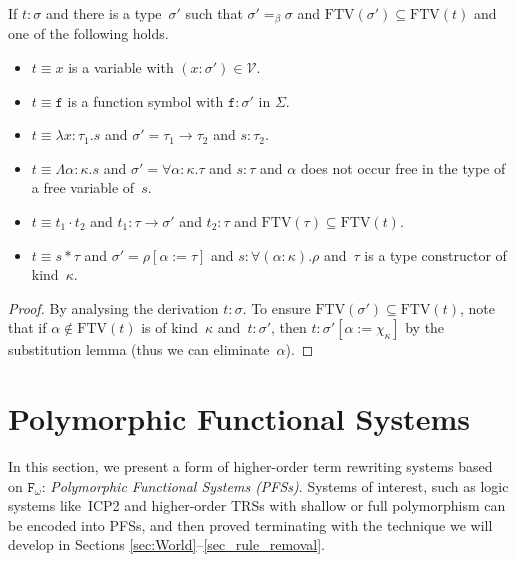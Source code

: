 \documentclass[a4paper,UKenglish,cleveref,autoref,numberwithinsect]{lipics-v2019}
\theoremstyle{definition}
\newcommand{\Fomega}{\mathtt{F}_\omega}
\newcommand{\Vars}{\mathcal{V}}
\newcommand{\arrtype}{\rightarrow}
\newcommand{\quant}[2]{\forall #1.#2}
\newcommand{\app}[2]{#1 \cdot #2}
\newcommand{\tapp}[2]{#1 * #2}
\newcommand{\subst}[2]{#1:=#2}
\newcommand{\abs}[2]{\lambda #1.#2}
\newcommand{\tabs}[2]{\Lambda #1.#2}
\newcommand{\FTV}{\mathrm{FTV}}
\begin{document}
\begin{lemma}\label{lem:generation}
  If $t : \sigma$ and there is a type~$\sigma'$ such that
  $\sigma' =_\beta \sigma$ and $\FTV(\sigma') \subseteq \FTV(t)$ and
  one of the following holds.
  \begin{itemize}
  \item $t \equiv x$ is a variable with $(x : \sigma') \in \Vars$.
  \item $t \equiv \mathtt{f}$ is a function symbol with
    $\mathtt{f} : \sigma'$ in $\Sigma$.
  \item $t \equiv \abs{x:\tau_1}{s}$ and
    $\sigma'=\tau_1\arrtype\tau_2$ and $s : \tau_2$.
  \item $t \equiv \tabs{\alpha:\kappa}{s}$ and
    $\sigma' = \quant{\alpha:\kappa}{\tau}$ and $s : \tau$ and
    $\alpha$ does not occur free in the type of a free variable
    of~$s$.
  \item $t \equiv \app{t_1}{t_2}$ and $t_1 : \tau \arrtype \sigma'$
    and $t_2 : \tau$ and $\FTV(\tau) \subseteq \FTV(t)$.
  \item $t \equiv \tapp{s}{\tau}$ and
    $\sigma' = \rho[\subst{\alpha}{\tau}]$ and
    $s : \quant{(\alpha:\kappa)}{\rho}$ and~$\tau$ is a type
    constructor of kind~$\kappa$.
  \end{itemize}
\end{lemma}

\begin{proof}
  By analysing the derivation $t : \sigma$. To ensure
  $\FTV(\sigma') \subseteq \FTV(t)$, note that if
  $\alpha \notin \FTV(t)$ is of kind~$\kappa$ and~$t : \sigma'$, then
  $t : \sigma'[\subst{\alpha}{\chi_\kappa}]$ by the substitution lemma
  (thus we can eliminate~$\alpha$).
\end{proof}

\section{Polymorphic Functional Systems}\label{sec_systems}

In this section, we present a form of higher-order term rewriting
systems based on $\Fomega$: \emph{Polymorphic Functional Systems
  (PFSs)}. Systems of interest, such as logic systems like~ICP2 and
higher-order TRSs with shallow or full polymorphism can be encoded
into PFSs, and then proved terminating with the technique we will
develop in Sections \ref{sec:World}--\ref{sec_rule_removal}.
\end{document}
